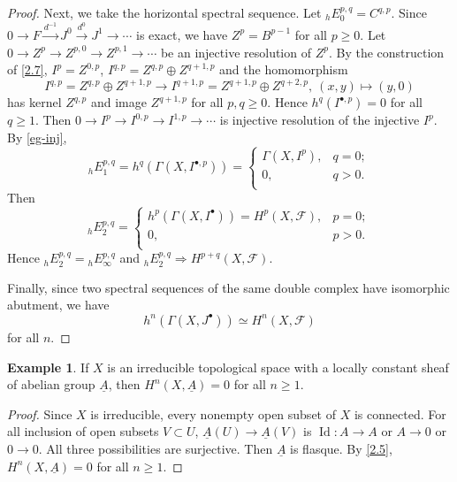 \documentclass{amsart}
\numberwithin{equation}{section}
\theoremstyle{plain}
\theoremstyle{definition}
\newtheorem{eg}[equation]{Example}
\DeclareMathOperator{\Id}{Id}
\begin{document}
\begin{proof}
	Next, we take the horizontal spectral sequence. 
	Let $ {_h}E_0^{p,q}=C^{q,p} $. 
	Since $ 0\to F\xrightarrow{d^{-1}} J^0\xrightarrow{d^0} J^1\to\cdots $ is exact, 
	we have $ Z^p=B^{p-1} $ for all $ p\ge 0 $. 
	Let $ 0\to Z^p\to Z^{p,0}\to Z^{p,1}\to\cdots $ be an injective resolution of $ Z^p $. 
	By the construction of \cref{2.7}, $ I^p=Z^{0,p} $, $ I^{q,p}=Z^{q,p}\oplus Z^{q+1,p} $ and the homomorphism $$ I^{q,p}=Z^{q,p}\oplus Z^{q+1,p}\to I^{q+1,p}=Z^{q+1,p}\oplus Z^{q+2,p},~(x,y)\mapsto (y,0) $$
	has kernel $ Z^{q,p} $ and image $ Z^{q+1,p} $ for all $ p,q\ge 0 $. 
	Hence $ h^q(I^{\bullet,p})=0 $ for all $ q\ge 1 $. 
	Then $ 0\to I^p\to I^{0,p}\to I^{1,p}\to\cdots $ is injective resolution of the injective $ I^p $. By \cref{eg-inj}, 
	\[
	{_h}E_1^{p,q}=h^q(\Gamma(X, I^{\bullet, p}))=\left\{
	\begin{array}{ll}
	\Gamma(X, I^{p}), & q=0;\\
	0,& q>0.\\
	\end{array}
	\right.
	\]
	Then $$ {_h}E_2^{p,q}=\left\{
	\begin{array}{ll}
	h^p(\Gamma(X, I^{\bullet}))=H^p(X,\mathscr F), &p=0;\\
	0,&p>0.\\
	\end{array}
	\right. $$
	Hence $ {_h}E_2^{p,q}={_h}E_{\infty}^{p,q} $ and $ {_h}E_2^{p,q}\Rightarrow H^{p+q}(X,\mathscr F)$. 
	
	Finally, since two spectral sequences of the same double complex have isomorphic abutment, we have $$ h^n(\Gamma(X, J^{\bullet}))\simeq H^n(X,\mathscr F) $$ for all $ n $. 
	
\end{proof}

\begin{eg}\label{eg1}
	If $ X $ is an irreducible topological space with a locally constant sheaf of abelian group $ \underline{A} $, then $ H^n(X, \underline{A}) =0$ for all $n\ge 1 $. 
\end{eg}

\begin{proof}
	Since $ X $ is irreducible, every nonempty open subset of $ X $ is connected. 
	For all inclusion of open subsets $ V\subset U $, $ \underline{A}(U)\to  \underline{A}(V)$ is $ \Id :A\to A$ or $ A\to 0 $ or $ 0\to 0 $. All three possibilities are surjective. 
	Then $ \underline{A} $  is flasque. 
	By \cref{2.5}, $ H^n(X, \underline{A})=0$ for all $ n\ge 1 $. 
\end{proof}
\end{document}
